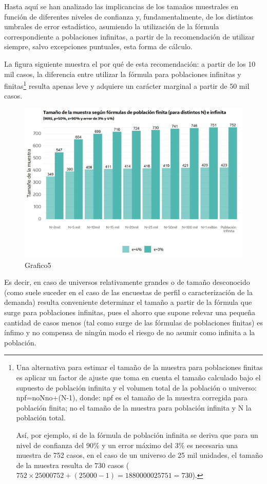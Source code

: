 \documentclass[
]{book}
\begin{document}
Hasta aquí se han analizado las implicancias de los tamaños muestrales en función de diferentes niveles de confianza y, fundamentalmente, de los distintos umbrales de error estadístico, asumiendo la utilización de la fórmula correspondiente a poblaciones infinitas, a partir de la recomendación de utilizar siempre, salvo excepciones puntuales, esta forma de cálculo.

La figura siguiente muestra el por qué de esta recomendación: a partir de los 10 mil casos, la diferencia entre utilizar la fórmula para poblaciones infinitas y finitas\footnote{Una alternativa para estimar el tamaño de la muestra para poblaciones finitas es aplicar un factor de ajuste que toma en cuenta el tamaño calculado bajo el supuesto de población infinita y el volumen total de la población o universo: npf=noNno+(N-1), donde: npf es el tamaño de la muestra corregida para población finita; no el tamaño de la muestra para población infinita y N la población total.

  Así, por ejemplo, si de la fórmula de población infinita se deriva que para un nivel de confianza del 90\% y un error máximo del 3\% es necesaria una muestra de 752 casos, en el caso de un universo de 25 mil unidades, el tamaño de la muestra resulta de 730 casos (\(752×25000752+(25000-1)=1880000025751=730\)).} resulta apenas leve y adquiere un carácter marginal a partir de 50 mil casos.

\begin{figure}
\includegraphics[width=1\linewidth]{imagenes/DT4_grafico5} \caption{Grafico5}\label{fig:Tamañodemuestra}
\end{figure}

Es decir, en caso de universos relativamente grandes o de tamaño desconocido (como suele suceder en el caso de las encuestas de perfil o caracterización de la demanda) resulta conveniente determinar el tamaño a partir de la fórmula que surge para poblaciones infinitas, pues el ahorro que supone relevar una pequeña cantidad de casos menos (tal como surge de las fórmulas de poblaciones finitas) es ínfimo y no compensa de ningún modo el riesgo de no asumir como infinita a la población.
\end{document}
